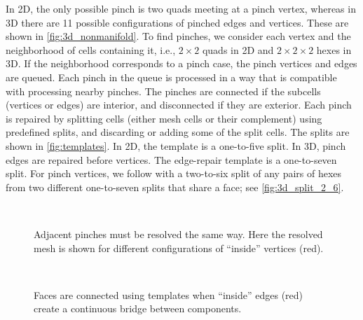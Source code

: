 In 2D, the only possible pinch is two quads meeting at a pinch vertex, whereas in 3D there are 11 possible configurations of pinched edges and vertices.
These are shown in \cref{fig:3d_nonmanifold}.
To find pinches, we consider each vertex and the neighborhood of cells containing it, 
i.e., $2 \times  2$ quads in 2D and $2 \times 2 \times 2$ hexes in 3D.
If the neighborhood corresponds to a pinch case, the pinch vertices and edges are queued.
Each pinch in the queue is processed in a way that is compatible with processing nearby pinches.
The  pinches are connected if the subcells (vertices or edges) are interior, and disconnected if they are exterior. 
Each pinch is repaired by splitting cells (either mesh cells or their complement) using predefined splits, and discarding or adding some of the split cells.
The splits are shown in \cref{fig:templates}.
In 2D, the template is a one-to-five split.
In 3D, pinch edges are repaired before vertices.
The edge-repair template is a one-to-seven split. 
For pinch vertices, we follow with a two-to-six split of any pairs of hexes from two different one-to-seven splits that share a face; see \cref{fig:3d_split_2_6}.

\begin{figure}[!htb]
\centering
{}
\hfill
{}
\\
\hfill
{}
\caption{Adjacent pinches must be resolved the same way. Here the resolved mesh is shown for different configurations of ``inside'' vertices (red).}
\label{fig:pinches_in_series}
\end{figure}

\begin{figure}[!htb]
\centering
{}
\hfill
{}
\\
\hfill
{}
\caption{Faces are connected using templates when ``inside'' edges (red) create a continuous bridge between components.}
\label{fig:connecting_edges}
\end{figure}

